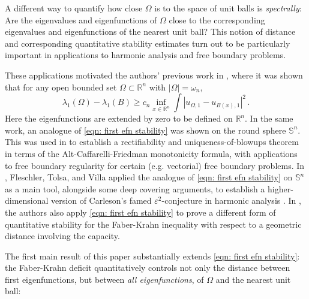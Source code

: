 \documentclass[10pt,a4paper]{amsart}
\numberwithin{equation}{section}
\def\R{{\mathbb R}}
\def\e{\varepsilon}
\def\W{\Omega}
\begin{document}
A different way to quantify how close $\W$ is to the space of unit balls
is {\it spectrally}: Are the eigenvalues and eigenfunctions of $\W$ close to the corresponding eigenvalues and eigenfunctions of the nearest unit ball? 
This notion of distance and corresponding quantitative stability estimates  turn out to be particularly important in applications to harmonic analysis and free boundary problems.

These applications motivated the authors' previous work in \cite{AKN1, AKN2}, where it was  shown that for any open bounded set $\W \subset \R^n$ with $|\W|  =\omega_n$,
\begin{equation}\label{eqn: first efn stability}
\lambda_1(\W ) - \lambda_1(B) \geq c_n \inf_{x \in\R^n} \int |u_{\W,1 } - u_{B(x), 1}|^2 \,.
\end{equation}
Here the eigenfunctions are extended by zero to be defined on $\R^n$.
In the same work, an analogue of \eqref{eqn: first efn stability} was shown on the round sphere $\mathbb{S}^n$. This was used in \cite{AKN3} to establish a rectifiability and uniqueness-of-blowups theorem in terms of the Alt-Caffarelli-Friedman monotonicity formula, with applications to free boundary regularity for certain (e.g. vectorial) free boundary problems. In \cite{FTV1, FTV2}, Fleschler, Tolsa, and Villa applied the analogue of \eqref{eqn: first efn stability} on $\mathbb{S}^n$ as a main tool, alongside  some deep covering arguments, to establish a higher-dimensional version of Carleson's famed $\e^2$-conjecture in harmonic analysis \cite{JTV21}. In \cite{FTV1}, the authors also apply \eqref{eqn: first efn stability} to prove a different form of quantitative stability for the Faber-Krahn inequality with respect to a geometric distance involving the capacity.

The first main result of this paper substantially extends \eqref{eqn: first efn stability}: the Faber-Krahn deficit quantitatively controls not only the distance between first eigenfunctions,  but between  {\it all eigenfunctions}, of $\W$ and the nearest unit ball:
\end{document}
